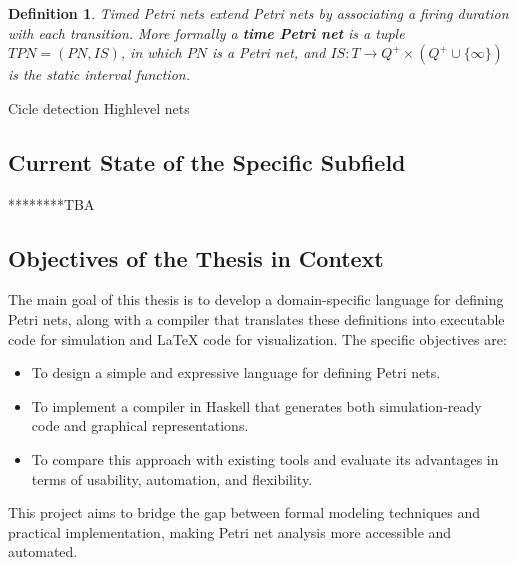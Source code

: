 \documentclass[12pt]{article}
\newtheorem{definition}{Definition}
\begin{document}
    \begin{definition}
        Timed Petri nets extend Petri nets by associating a firing duration with each transition. More formally a \textbf{time Petri net} is a tuple $TPN=(PN,IS)$, in which $PN$ is a Petri net, and $IS:T\rightarrow Q^+ \times (Q^+ \cup \{\infty\})$ is the static interval function. \cite{diaz2013petri}
    \end{definition}
        Cicle detection
        Highlevel nets
    
    \subsection{Current State of the Specific Subfield}
    ********TBA
    \subsection{Objectives of the Thesis in Context}
    The main goal of this thesis is to develop a domain-specific language for defining Petri nets, along with a compiler that translates these definitions into executable code for simulation and LaTeX code for visualization. The specific objectives are:
    \begin{itemize}
        \item To design a simple and expressive language for defining Petri nets.
        \item To implement a compiler in Haskell that generates both simulation-ready code and graphical representations.
        \item To compare this approach with existing tools and evaluate its advantages in terms of usability, automation, and flexibility.
    \end{itemize}
    This project aims to bridge the gap between formal modeling techniques and practical implementation, making Petri net analysis more accessible and automated.
    
    
\end{document}
